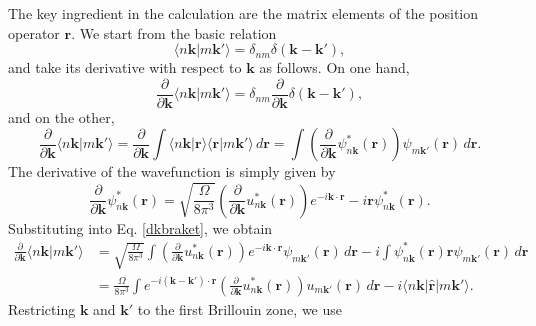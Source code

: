 The key ingredient in the calculation are the matrix elements of the position
operator $\mathbf{r}$. We start from the basic relation
\begin{equation}\label{nbraket}
\langle n\mathbf{k}\vert m\mathbf{k}'\rangle =
\delta_{nm}\delta(\mathbf{k} - \mathbf{k}'),
\end{equation}
and take its derivative with respect to $\mathbf{k}$ as follows. On one hand,
\begin{equation}\label{ddk1}
\frac{\partial}{\partial\mathbf{k}}
\langle n\mathbf{k}\vert m\mathbf{k}'\rangle =
\delta_{nm}\frac{\partial}{\partial\mathbf{k}}\delta(\mathbf{k} - \mathbf{k}'),
\end{equation}
and on the other,
\begin{equation}\label{dkbraket}
\frac{\partial}{\partial\mathbf{k}}\langle n\mathbf{k}\vert m\mathbf{k}'\rangle
= \frac{\partial}{\partial\mathbf{k}}\int
\langle n\mathbf{k}\vert \mathbf{r}\rangle
\langle \mathbf{r}\vert m\mathbf{k}'\rangle
\,d\mathbf{r} 
= \int
\left(
\frac{\partial}{\partial\mathbf{k}}
\psi^{*}_{n\mathbf{k}}(\mathbf{r})
\right)
\psi_{m\mathbf{k}'}(\mathbf{r})\,d\mathbf{r}.
\end{equation}
The derivative of the wavefunction is simply given by
\begin{equation}\label{dpsi}
\frac{\partial}{\partial\mathbf{k}}\psi^{*}_{n\mathbf{k}}(\mathbf{r})
= \sqrt{\frac{\Omega}{8\pi^{3}}}
\left(
\frac{\partial}{\partial\mathbf{k}}
u^{*}_{n\mathbf{k}}(\mathbf{r})
\right)
e^{-i\mathbf{k}\cdot\mathbf{r}} - i\mathbf{r}\psi^{*}_{n\mathbf{k}}(\mathbf{r}).
\end{equation}
Substituting into Eq. \eqref{dkbraket}, we obtain
\begin{align}\label{dkbraket2}
\frac{\partial}{\partial\mathbf{k}}\langle n\mathbf{k}\vert m\mathbf{k}'\rangle
&= \sqrt{\frac{\Omega}{8\pi^{3}}}\int
\left(
\frac{\partial}{\partial\mathbf{k}}
u^{*}_{n\mathbf{k}}(\mathbf{r})\right)e^{-i\mathbf{k}\cdot\mathbf{r}}
\psi_{m\mathbf{k}'}(\mathbf{r})\,d\mathbf{r} 
- i\int\psi^{*}_{n\mathbf{k}}(\mathbf{r})\mathbf{r}
  \psi_{m\mathbf{k}'}(\mathbf{r})\,d\mathbf{r}\nonumber \\
&= \frac{\Omega}{8\pi^{3}}\int
  e^{-i(\mathbf{k}-\mathbf{k}')\cdot\mathbf{r}}
  \left(
  \frac{\partial}{\partial\mathbf{k}}u^{*}_{n\mathbf{k}}(\mathbf{r})
  \right)
u_{m\mathbf{k}'}(\mathbf{r})\,d\mathbf{r}
- i \langle n\mathbf{k}\vert\hat{\mathbf{r}}\vert m\mathbf{k}'\rangle.
\end{align}
Restricting $\mathbf{k}$ and $\mathbf{k}'$ to the first Brillouin zone, we use
